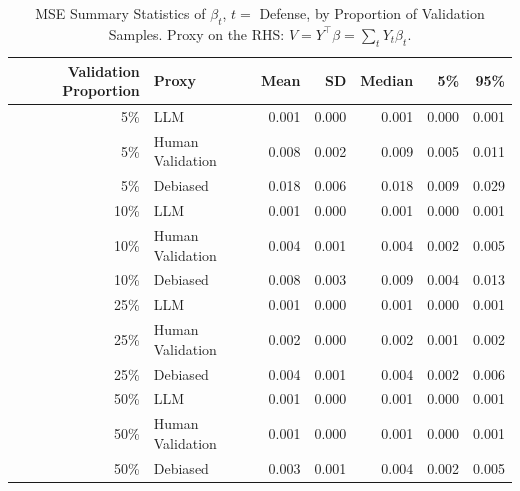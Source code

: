 \begin{table}

\caption{\label{tab:unnamed-chunk-1}MSE Summary Statistics of $\beta_{t}$, $t=$ Defense, by Proportion of Validation Samples.
      Proxy on the RHS: $V = Y^\top \beta = \sum_{t} Y_t \beta_t$.}
\centering
\begin{tabular}[t]{rlrrrrr}
\toprule
Validation Proportion & Proxy & Mean & SD & Median & 5\% & 95\%\\
\midrule
5\% & LLM & 0.001 & 0.000 & 0.001 & 0.000 & 0.001\\
5\% & Human Validation & 0.008 & 0.002 & 0.009 & 0.005 & 0.011\\
5\% & Debiased & 0.018 & 0.006 & 0.018 & 0.009 & 0.029\\
10\% & LLM & 0.001 & 0.000 & 0.001 & 0.000 & 0.001\\
10\% & Human Validation & 0.004 & 0.001 & 0.004 & 0.002 & 0.005\\
10\% & Debiased & 0.008 & 0.003 & 0.009 & 0.004 & 0.013\\
25\% & LLM & 0.001 & 0.000 & 0.001 & 0.000 & 0.001\\
25\% & Human Validation & 0.002 & 0.000 & 0.002 & 0.001 & 0.002\\
25\% & Debiased & 0.004 & 0.001 & 0.004 & 0.002 & 0.006\\
50\% & LLM & 0.001 & 0.000 & 0.001 & 0.000 & 0.001\\
50\% & Human Validation & 0.001 & 0.000 & 0.001 & 0.000 & 0.001\\
50\% & Debiased & 0.003 & 0.001 & 0.004 & 0.002 & 0.005\\
\bottomrule
\end{tabular}
\end{table}
